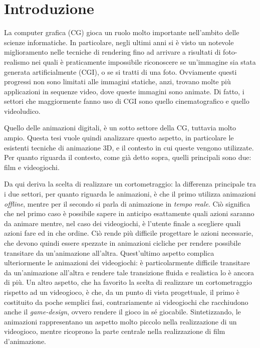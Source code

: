 
\chapter{Introduzione} %

\label{Chapter1} %


La computer grafica (CG) gioca un ruolo molto importante nell'ambito delle scienze informatiche.
In particolare, negli ultimi anni si è visto un notevole miglioramento nelle tecniche di rendering fino ad arrivare a risultati di foto-realismo nei quali è praticamente impossibile riconoscere se un'immagine sia stata generata artificialmente (CGI), o se si tratti di una foto.
Ovviamente questi progressi non sono limitati alle immagini statiche, anzi, trovano molte più applicazioni in sequenze video, dove queste immagini sono animate.
Di fatto, i settori che maggiormente fanno uso di CGI sono quello cinematografico e quello videoludico.

Quello delle animazioni digitali, è un sotto settore della CG, tuttavia molto ampio.
Questa tesi vuole quindi analizzare questo aspetto, in particolare le esistenti tecniche di animazione 3D, e il contesto in cui queste vengono utilizzate.
Per quanto riguarda il contesto, come già detto sopra, quelli principali sono due: film e videogiochi.

Da qui deriva la scelta di realizzare un cortometraggio: la differenza principale tra i due settori, per quanto riguarda le animazioni, è che il primo utilizza animazioni \emph{offline}, mentre per il secondo si parla di animazione in \emph{tempo reale}.
Ciò significa che nel primo caso è possibile sapere in anticipo esattamente quali azioni saranno da animare mentre, nel caso dei videogiochi, è l'utente finale a scegliere quali azioni fare ed in che ordine.
Ciò rende più difficile progettare le azioni necessarie, che devono quindi essere spezzate in animazioni cicliche per rendere possibile transitare da un'animazione all'altra.
Quest'ultimo aspetto complica ulteriormente le animazioni dei videogiochi: è particolarmente difficile transitare da un'animazione all'altra e rendere tale transizione fluida e realistica lo è ancora di più.
Un altro aspetto, che ha favorito la scelta di realizzare un cortometraggio rispetto ad un videogioco, è che, da un punto di vista progettuale, il primo è costituito da poche semplici fasi, contrariamente ai videogiochi che racchiudono anche il \emph{game-design}, ovvero rendere il gioco in sé giocabile.
Sintetizzando, le animazioni rappresentano un aspetto molto piccolo nella realizzazione di un videogioco, mentre ricoprono la parte centrale nella realizzazione di film d'animazione.

